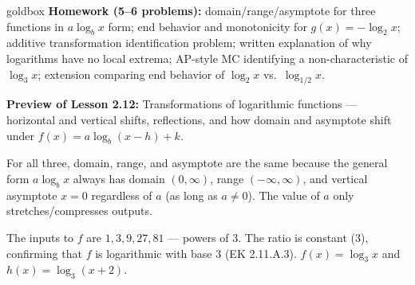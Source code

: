 \documentclass[10pt]{article}
\begin{document}
\begin{skillbox}{goldbox}
\textbf{Homework (5--6 problems):} domain/range/asymptote for three functions in $a\log_b x$
form; end behavior and monotonicity for $g(x) = -\log_2 x$; additive transformation
identification problem; written explanation of why logarithms have no local extrema;
AP-style MC identifying a non-characteristic of $\log_3 x$; extension comparing end behavior
of $\log_2 x$ vs.\ $\log_{1/2} x$.

\textbf{Preview of Lesson 2.12:} Transformations of logarithmic functions --- horizontal and
vertical shifts, reflections, and how domain and asymptote shift under $f(x) = a\log_b(x-h)+k$.
\end{skillbox}

\begin{teachernote}[Homework]
For all three, domain, range, and asymptote are the same because the general form $a\log_b x$
always has domain $(0,\infty)$, range $(-\infty,\infty)$, and vertical asymptote $x=0$
regardless of $a$ (as long as $a \ne 0$). The value of $a$ only stretches/compresses outputs.

The inputs to $f$ are $1, 3, 9, 27, 81$ --- powers of 3. The ratio is constant (3), confirming
that $f$ is logarithmic with base 3 (EK 2.11.A.3). $f(x) = \log_3 x$ and $h(x) = \log_3(x+2)$.
\end{teachernote}
\end{document}
